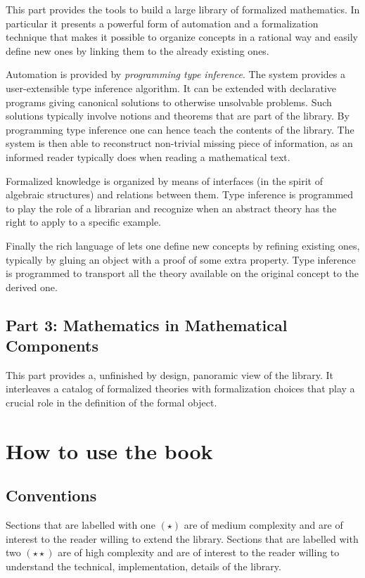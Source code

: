 This part provides the tools to build a large library of formalized
mathematics.  In particular it presents a powerful form of automation
and a formalization technique that makes it possible to organize
concepts in a rational way and easily define new ones by linking them
to the already existing ones.

Automation is provided by \emph{programming type inference}.
The \Coq{} system provides a user-extensible type inference
algorithm.  It can be extended with declarative programs
giving canonical solutions to otherwise unsolvable problems.
Such solutions typically involve notions and theorems that
are part of the \mcbMC{} library.  By programming type inference
one can hence teach \Coq{} the contents of the library.  The system
is then able to reconstruct non-trivial missing piece of information,
as an informed reader typically does when reading a mathematical text.

Formalized knowledge is organized by means of interfaces (in the spirit of
algebraic structures) and relations between them.  Type inference is programmed
to play the role of a librarian and recognize when an abstract theory has the
right to apply to a specific example.

Finally the rich language of \Coq{} lets one define new concepts
by refining existing ones, typically by gluing an object with
a proof of some extra property.  Type inference is programmed
to transport all the theory available on
the original concept to the derived one.

\subsection{Part 3: Mathematics in Mathematical Components}

This part provides a, unfinished by design, panoramic view of the
\mcbMC{} library.  It interleaves a catalog of formalized theories with
formalization choices that play a crucial role in the
definition of the formal object.

\section{How to use the book}

\subsection{Conventions}
Sections that are labelled with one $(\star)$ are of medium complexity and are
of interest to the reader willing to extend the \mcbMC{} library.  Sections
that are labelled with two $(\star\star)$ are of high complexity and are of
interest to the reader willing to understand the technical, implementation,
details of the \mcbMC{} library.

